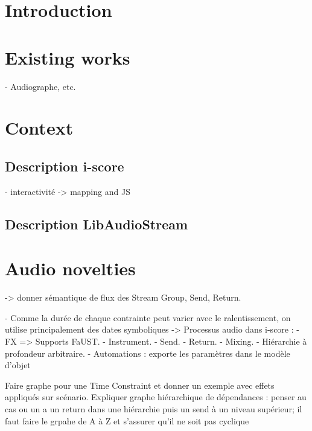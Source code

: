\documentclass{article}
\title{\papertitle}
\begin{document}
%
\capstartfalse
\maketitle
\capstarttrue
%
\begin{abstract}
Place your abstract at the top left column on the first page.
Please write about 150--200 words that specifically highlight the purpose of your work,
its context, and provide a brief synopsis of your results.
Avoid equations in this part.
\end{abstract}
\section{Introduction}
\section{Existing works}
- Audiographe, etc.

\section{Context}
\subsection{Description i-score}
- interactivité
-> mapping and JS

\subsection{Description LibAudioStream}

\section{Audio novelties}
-> donner sémantique de flux des Stream Group, Send, Return.

- Comme la durée de chaque contrainte peut varier avec le ralentissement, on utilise principalement 
des dates symboliques
-> Processus audio dans i-score : 
- FX => Supports FaUST.
- Instrument.
- Send.
- Return.
- Mixing.
- Hiérarchie à profondeur arbitraire.
- Automations : exporte les paramètres dans le modèle d'objet

Faire graphe pour une Time Constraint et donner un exemple avec effets appliqués sur scénario.
Expliquer graphe hiérarchique de dépendances : penser au cas ou un a un return dans une hiérarchie puis un send à un niveau supérieur; il faut faire le grpahe de A à Z et s'assurer qu'il ne soit pas cyclique
\end{document}
